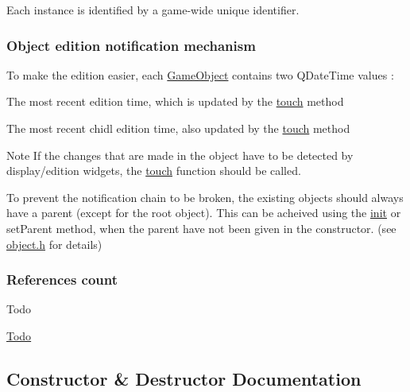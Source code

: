 Each instance is identified by a game-\/wide unique identifier.

\subsubsection*{Object edition notification mechanism}

To make the edition easier, each \hyperlink{class_game_object}{Game\+Object} contains two Q\+Date\+Time values \+:
\begin{DoxyItemize}
\item The most recent edition time, which is updated by the \hyperlink{class_game_object_a2130d5674df041b5a7eaf987f9b1e642}{touch} method
\item The most recent chidl edition time, also updated by the \hyperlink{class_game_object_a2130d5674df041b5a7eaf987f9b1e642}{touch} method
\end{DoxyItemize}

\begin{DoxyNote}{Note}
If the changes that are made in the object have to be detected by display/edition widgets, the \hyperlink{class_game_object_a2130d5674df041b5a7eaf987f9b1e642}{touch} function should be called. 

To prevent the notification chain to be broken, the existing objects should always have a parent (except for the root object). This can be acheived using the \hyperlink{class_game_object_a97be7b59b2e76e7d60de2146b894eed9}{init} or set\+Parent method, when the parent have not been given in the constructor. (see \hyperlink{object_8h}{object.\+h} for details)
\end{DoxyNote}
\subsubsection*{References count}

\begin{DoxyRefDesc}{Todo}
\item[\hyperlink{todo__todo000001}{Todo}]\end{DoxyRefDesc}


\subsection{Constructor \& Destructor Documentation}
\hypertarget{class_game_object_ab00c537faf6eb4439c60003141a763b9}{}\label{class_game_object_ab00c537faf6eb4439c60003141a763b9} 
